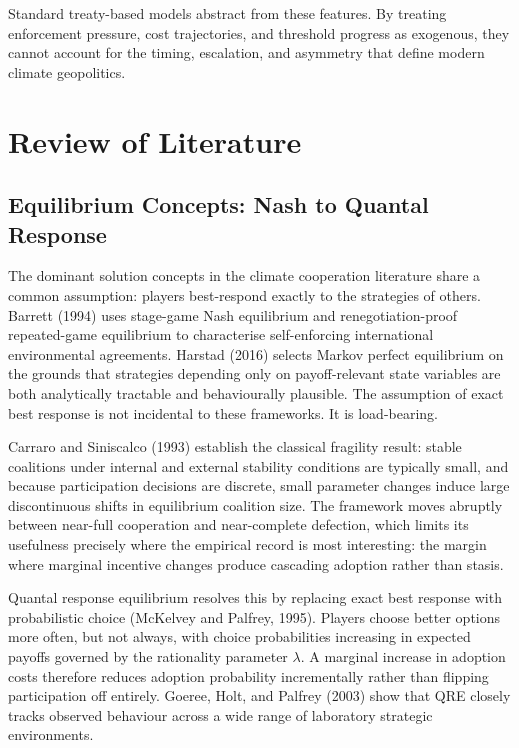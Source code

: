 \documentclass[10pt,a4paper]{article}
\begin{document}
Standard treaty-based models abstract from these features. By treating enforcement pressure, cost trajectories, and threshold progress as exogenous, they cannot account for the timing, escalation, and asymmetry that define modern climate geopolitics.


\clearpage
\needspace{12em}
\section{Review of Literature}

\needspace{12em}
\subsection*{Equilibrium Concepts: Nash to Quantal Response}

The dominant solution concepts in the climate cooperation literature share a common assumption: players
best-respond exactly to the strategies of others. Barrett (1994) uses stage-game Nash equilibrium and
renegotiation-proof repeated-game equilibrium to characterise self-enforcing international environmental
agreements. Harstad (2016) selects Markov perfect equilibrium on the grounds that strategies depending
only on payoff-relevant state variables are both analytically tractable and behaviourally plausible. The
assumption of exact best response is not incidental to these frameworks. It is load-bearing.

Carraro and Siniscalco (1993) establish the classical fragility result: stable coalitions under internal and
external stability conditions are typically small, and because participation decisions are discrete, small
parameter changes induce large discontinuous shifts in equilibrium coalition size. The framework moves
abruptly between near-full cooperation and near-complete defection, which limits its usefulness precisely
where the empirical record is most interesting: the margin where marginal incentive changes produce
cascading adoption rather than stasis.

Quantal response equilibrium resolves this by replacing exact best response with probabilistic choice
(McKelvey and Palfrey, 1995). Players choose better options more often, but not always, with choice
probabilities increasing in expected payoffs governed by the rationality parameter $\lambda$. A marginal increase
in adoption costs therefore reduces adoption probability incrementally rather than flipping participation
off entirely. Goeree, Holt, and Palfrey (2003) show that QRE closely tracks observed behaviour across a
wide range of laboratory strategic environments.
\end{document}
